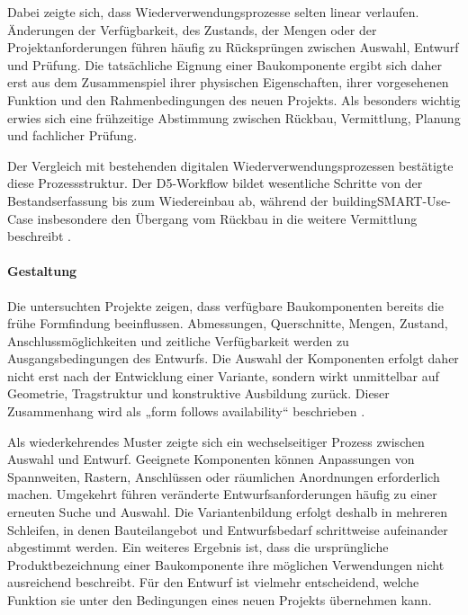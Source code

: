 \documentclass[type=zwischenbericht]{zukunftbau}
\begin{document}
\begin{SemioNest}
Dabei zeigte sich, dass Wiederverwendungsprozesse selten linear verlaufen. Änderungen der Verfügbarkeit, des Zustands, der Mengen oder der Projektanforderungen führen häufig zu Rücksprüngen zwischen Auswahl, Entwurf und Prüfung. Die tatsächliche Eignung einer Baukomponente ergibt sich daher erst aus dem Zusammenspiel ihrer physischen Eigenschaften, ihrer vorgesehenen Funktion und den Rahmenbedingungen des neuen Projekts. Als besonders wichtig erwies sich eine frühzeitige Abstimmung zwischen Rückbau, Vermittlung, Planung und fachlicher Prüfung.

Der Vergleich mit bestehenden digitalen Wiederverwendungsprozessen bestätigte diese Prozessstruktur. Der D5-Workflow bildet wesentliche Schritte von der Bestandserfassung bis zum Wiedereinbau ab, während der buildingSMART-Use-Case insbesondere den Übergang vom Rückbau in die weitere Vermittlung beschreibt \cite{de-wolf-d5-digital-circular-workflow-2024,buildingsmart-benelux-decommissioning-to-reuse-2024}.

\begin{SemioNest}
\paragraph{Gestaltung}
Die untersuchten Projekte zeigen, dass verfügbare Baukomponenten bereits die frühe Formfindung beeinflussen. Abmessungen, Querschnitte, Mengen, Zustand, Anschlussmöglichkeiten und zeitliche Verfügbarkeit werden zu Ausgangsbedingungen des Entwurfs. Die Auswahl der Komponenten erfolgt daher nicht erst nach der Entwicklung einer Variante, sondern wirkt unmittelbar auf Geometrie, Tragstruktur und konstruktive Ausbildung zurück. Dieser Zusammenhang wird als „form follows availability“ beschrieben \cite{bruetting-senatore-fivet-form-follows-availability-2019}.

Als wiederkehrendes Muster zeigte sich ein wechselseitiger Prozess zwischen Auswahl und Entwurf. Geeignete Komponenten können Anpassungen von Spannweiten, Rastern, Anschlüssen oder räumlichen Anordnungen erforderlich machen. Umgekehrt führen veränderte Entwurfsanforderungen häufig zu einer erneuten Suche und Auswahl. Die Variantenbildung erfolgt deshalb in mehreren Schleifen, in denen Bauteilangebot und Entwurfsbedarf schrittweise aufeinander abgestimmt werden. Ein weiteres Ergebnis ist, dass die ursprüngliche Produktbezeichnung einer Baukomponente ihre möglichen Verwendungen nicht ausreichend beschreibt. Für den Entwurf ist vielmehr entscheidend, welche Funktion sie unter den Bedingungen eines neuen Projekts übernehmen kann.


\end{SemioNest}
\end{SemioNest}
\end{document}
